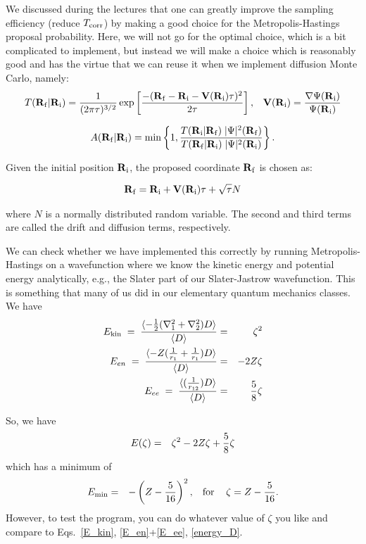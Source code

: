 \documentclass[11pt,aps,prb,amsmath,amssymb,superscriptaddress,notitlepage]{revtex4-1}
\def\beq{\begin{eqnarray}}
\def\eeq{\end{eqnarray}}
\def\Tcorr{T_{\rm corr}}
\begin{document}
We discussed during the lectures that one can greatly improve the sampling efficiency (reduce $\Tcorr$) by
making a good choice for the Metropolis-Hastings proposal probability.  Here, we will not go for the
optimal choice, which is a bit complicated to implement, but instead we will make a choice which is reasonably
good and has the virtue that we can reuse it when we implement diffusion Monte Carlo, namely:
\beq
\Pfi = {1 \over (2 \pi \tau)^{3/2}} \exp\left[{-(\f - \i - \V(\Ri) \tau)^2 \over 2 \tau}\right], \;\;\; \V(\Ri) = {\nabla \PsiRi \over \PsiRi}
\label{DMC_proposal}
\eeq

\beq
\Afi = {\rm min}\left\{1,{\Pif\; \Psisq(\Rf) \over \Pfi\; \Psisq(\Ri)}\right\}.
\label{acceptance}
\eeq

Given the initial position ${{\bf R}\!\,_{\rm i}}$, the proposed coordinate ${{\bf R}\!\,_{\rm f}}$ is chosen as:

\beq
\f = \i + \V(\i)\tau + \sqrt{\tau} N
\label{proposed_coord}
\eeq

where $N$ is a normally distributed random variable. The second and third terms are called the drift and diffusion terms, respectively.

We can check whether we have implemented this correctly by running Metropolis-Hastings on a wavefunction
where we know the kinetic energy and potential energy analytically, e.g., the Slater part of our Slater-Jastrow
wavefunction.  This is something that many of us did in our elementary quantum mechanics classes.
We have
\beq
\label{E_kin}
E_{\rm kin} \;=\; {\langle -{1 \over 2} (\nabla_1^2 + \nabla_2^2) D \rangle \over \langle D \rangle} &=& \zeta^2 \\
\label{E_en}
E_{en}  \;=\; {\langle -Z ({1 \over r_1} +{1 \over r_1}) D \rangle \over \langle D \rangle} &=& -2 Z \zeta  \\
\label{E_ee}
E_{ee}  \;=\; {\langle ({1 \over r_{12}} ) D \rangle \over \langle D \rangle} &=& {5 \over 8} \zeta
\eeq

So, we have
\beq
E(\zeta) &=& \zeta^2 -2 Z \zeta + {5 \over 8} \zeta
\label{energy_D}
\eeq
which has a minimum of
\beq
E_{\rm min} &=& -\left(Z - {5 \over 16} \right)^2, \mbox{\hskip 3mm for \hskip 3mm} \zeta=Z-{5 \over 16}.
\label{energy_D_min}
\eeq
However, to test the program, you can do whatever value of $\zeta$ you like and compare to Eqs.~\ref{E_kin},
\ref{E_en}+\ref{E_ee}, \ref{energy_D}.
\end{document}
